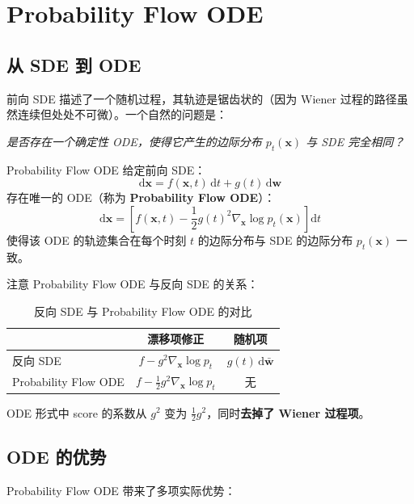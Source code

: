 \section{Probability Flow ODE}

\subsection{从 SDE 到 ODE}

前向 SDE 描述了一个随机过程，其轨迹是锯齿状的（因为 Wiener 过程的路径虽然连续但处处不可微）。一个自然的问题是：

\textit{是否存在一个确定性 ODE，使得它产生的边际分布 $p_t(\mathbf{x})$ 与 SDE 完全相同？}

\begin{importantbox}{Probability Flow ODE}
给定前向 SDE：
$$
\mathrm{d}\mathbf{x} = f(\mathbf{x}, t)\,\mathrm{d}t + g(t)\,\mathrm{d}\mathbf{w}
$$
存在唯一的 ODE（称为 \textbf{Probability Flow ODE}）：
$$
\mathrm{d}\mathbf{x} = \left[f(\mathbf{x}, t) - \frac{1}{2}g(t)^2 \nabla_{\mathbf{x}} \log p_t(\mathbf{x})\right]\mathrm{d}t
$$
使得该 ODE 的轨迹集合在每个时刻 $t$ 的边际分布与 SDE 的边际分布 $p_t(\mathbf{x})$ 一致。
\end{importantbox}

注意 Probability Flow ODE 与反向 SDE 的关系：

\begin{table}[H]
\centering
\begin{tabular}{lcc}
\toprule
& \textbf{漂移项修正} & \textbf{随机项} \\
\midrule
反向 SDE & $f - g^2 \nabla_{\mathbf{x}} \log p_t$ & $g(t)\,\mathrm{d}\bar{\mathbf{w}}$ \\
Probability Flow ODE & $f - \frac{1}{2} g^2 \nabla_{\mathbf{x}} \log p_t$ & 无 \\
\bottomrule
\end{tabular}
\caption{反向 SDE 与 Probability Flow ODE 的对比}
\end{table}

ODE 形式中 score 的系数从 $g^2$ 变为 $\frac{1}{2}g^2$，同时\textbf{去掉了 Wiener 过程项}。

\subsection{ODE 的优势}

Probability Flow ODE 带来了多项实际优势：


